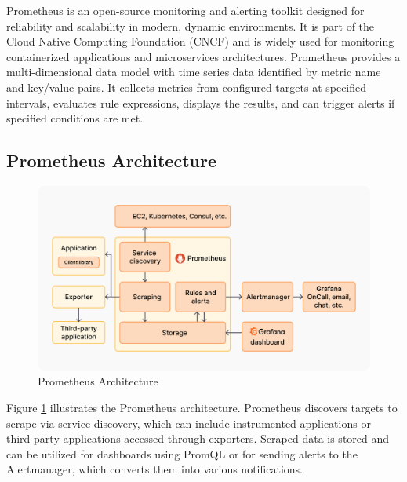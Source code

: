 Prometheus is an open-source monitoring and alerting toolkit designed for reliability and scalability in modern, dynamic environments. It is part of the Cloud Native Computing Foundation (CNCF) and is widely used for monitoring containerized applications and microservices architectures. Prometheus provides a multi-dimensional data model with time series data identified by metric name and key/value pairs. It collects metrics from configured targets at specified intervals, evaluates rule expressions, displays the results, and can trigger alerts if specified conditions are met.

\subsection{Prometheus Architecture}

\begin{figure}[H]
  \centering
  \includegraphics[width=16cm]{Figures/prometheus-grafana-architecture-diagram.png}
  \caption{Prometheus Architecture}
  \label{fig:prometheus_architecture}
\end{figure}

Figure \ref{fig:prometheus_architecture} illustrates the Prometheus architecture. Prometheus discovers targets to scrape via service discovery, which can include instrumented applications or third-party applications accessed through exporters. Scraped data is stored and can be utilized for dashboards using PromQL or for sending alerts to the Alertmanager, which converts them into various notifications.

